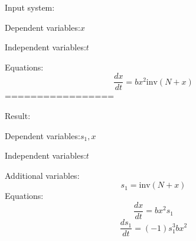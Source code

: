 \documentclass[10pt,a4paper]{article}
\begin{document}
Input system:

Dependent variables:$x$

Independent variables:$t$

Equations:
\begin{dmath*}\frac{dx}{dt} = b  x ^ {2}  \text{inv}\left(N + x\right)\end{dmath*}
=================

Result:

Dependent variables:$s_{1}, x$

Independent variables:$t$

Additional variables:
\begin{dmath*}s_{1} = \text{inv}\left(N + x\right)\end{dmath*}
Equations:
\begin{dmath*}\frac{dx}{dt} = b  x ^ {2}  s_{1}\end{dmath*}
\begin{dmath*}\frac{ds_{1}}{dt} = \left(-1\right)  s_{1} ^ {3}  b  x ^ {2}\end{dmath*}
\end{document}
